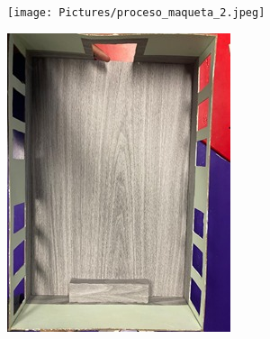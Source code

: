 \documentclass[12pt]{article} %
\begin{document}
\begin{center}
\vspace{0.5cm} %

\begin{minipage}[b]{0.45\textwidth}
  \centering
  \texttt{[image: Pictures/proceso\_maqueta\_2.jpeg]}
  \label{fig:proceso2}
\end{minipage}
\hspace{0.5cm} %
\begin{minipage}[b]{0.45\textwidth}
  \centering
  \includegraphics[width=\linewidth]{Pictures/proceso_maqueta_3.jpeg}
  \label{fig:proceso3}
\end{minipage}
\end{center}



\end{document}
